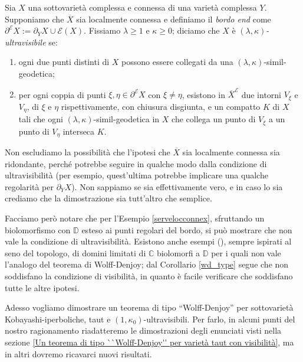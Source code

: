 \begin{defn} \label{ultravisibility}
    Sia $X$ una sottovarietà complessa e connessa di una varietà complessa $Y$. Supponiamo che $\overline{X}$ sia localmente connessa e definiamo il \textit{bordo end} come ${\partial^\mathcal{E}X:=\partial_YX\cup\mathcal{E}(X)}$. Fissiamo $\lambda \ge 1$ e $\kappa \ge 0$; diciamo che $X$ è \textit{$(\lambda,\kappa)$-ultravisibile} se:
    \begin{enumerate}
        \item ogni due punti distinti di $X$ possono essere collegati da una $(\lambda,\kappa)$-simil-geodetica;
        \item per ogni coppia di punti $\xi,\eta\in\partial^\mathcal{E}X$ con $\xi\not=\eta$, esistono in $\overline{X}^\mathcal{E}$ due intorni $V_\xi$ e $V_\eta$, di $\xi$ e $\eta$ rispettivamente, con chiusura disgiunta, e un compatto $K$ di $X$ tali che  ogni $(\lambda,\kappa)$-simil-geodetica in $X$ che collega un punto di $V_\xi$ a un punto di $V_\eta$ interseca $K$.
    \end{enumerate}
\end{defn}

\begin{oss}
    Non escludiamo la possibilità che l'ipotesi che $\overline{X}$ sia localmente connessa sia ridondante, perché potrebbe seguire in qualche modo dalla condizione di ultravisibilità (per esempio, quest'ultima potrebbe implicare una qualche regolarità per $\partial_YX$). Non sappiamo se sia effettivamente vero, e in caso lo sia crediamo che la dimostrazione sia tutt'altro che semplice.
    
    Facciamo però notare che per l'Esempio \ref{servelocconnex}, sfruttando un biolomorfismo con $\mathbb{D}$ esteso ai punti regolari del bordo, si può mostrare che non vale la condizione di ultravisibilità. Esistono anche esempi (\cite[Example 3.3.8]{A6}), sempre ispirati al seno del topologo, di domini limitati di $\mathbb{C}$ biolomorfi a $\mathbb{D}$ per i quali non vale l'analogo del teorema di Wolff-Denjoy; dal Corollario \ref{wd_type} segue che non soddisfano la condizione di visibilità, in quanto è facile verificare che soddisfano tutte le altre ipotesi.
\end{oss}

Adesso vogliamo dimostrare un teorema di tipo ``Wolff-Denjoy'' per sottovarietà Kobayashi-iperboliche, taut e $(1,\kappa_0)$-ultravisibili. Per farlo, in alcuni punti del nostro ragionamento riadatteremo le dimostrazioni degli enunciati visti nella sezione \ref{Un teorema di tipo ``Wolff-Denjoy'' per varietà taut con visibilità}, ma in altri dovremo ricavarci nuovi risultati.

